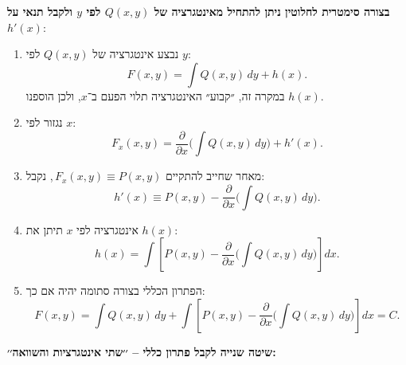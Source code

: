 \documentclass{article}
\numberwithin{equation}{section}
\begin{document}
\textbf{
בצורה סימטרית לחלוטין ניתן להתחיל מאינטגרציה של $Q(x,y)$ לפי $y$ ולקבל תנאי על $h'(x)$}:

\begin{enumerate}
\item נבצע אינטגרציה של $Q(x,y)$ לפי $y$:
\[
F(x,y) = \int Q(x,y)\,dy + h(x).
\]
במקרה זה, ״קבוע״ האינטגרציה תלוי הפעם ב־$x$, ולכן הוספנו $h(x)$.

\item נגזור לפי $x$:
\[
F_x(x,y) = \frac{\partial}{\partial x}\Big(\int Q(x,y)\,dy\Big) + h'(x).
\]

\item מאחר שחייב להתקיים \(\,F_x(x,y)\equiv P(x,y)\), נקבל:
\[
h'(x) \equiv P(x,y) - \frac{\partial}{\partial x}\Big(\int Q(x,y)\,dy\Big).
\]

\item אינטגרציה לפי $x$ תיתן את $h(x)$:
\[
h(x) = \int \left[P(x,y) - \frac{\partial}{\partial x}\Big(\int Q(x,y)\,dy\Big)\right]dx.
\]

\item הפתרון הכללי בצורה סתומה יהיה אם כך:
\[
F(x,y) = \boxed{\int Q(x,y)\,dy + \int \left[P(x,y) - \frac{\partial}{\partial x}\Big(\int Q(x,y)\,dy\Big)\right]dx =  C}.
\]
\end{enumerate}

\textbf{שיטה שנייה לקבל פתרון כללי – ׳׳שתי אינטגרציות והשוואה׳׳:}
\end{document}
